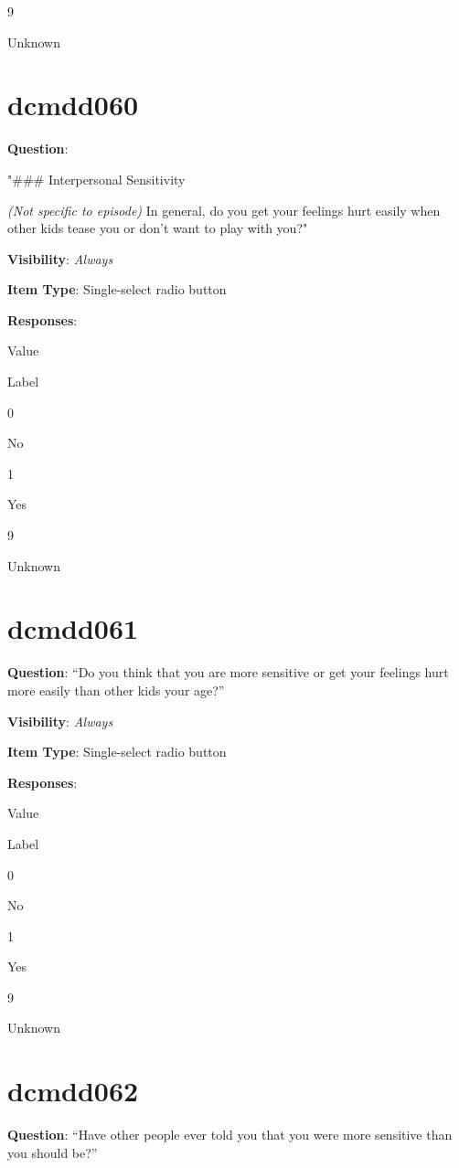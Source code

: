 \documentclass[
]{book}
\begin{document}
9

Unknown

\hypertarget{dcmdd060}{%
\section{dcmdd060}\label{dcmdd060}}

\textbf{Question}:

"\#\#\# Interpersonal Sensitivity

\emph{(Not specific to episode)} In general, do you get your feelings hurt easily when other kids tease you or don't want to play with you?"

\textbf{Visibility}: \emph{Always}

\textbf{Item Type}: Single-select radio button

\textbf{Responses}:

Value

Label

0

No

1

Yes

9

Unknown

\hypertarget{dcmdd061}{%
\section{dcmdd061}\label{dcmdd061}}

\textbf{Question}: ``Do you think that you are more sensitive or get your feelings hurt more easily than other kids your age?''

\textbf{Visibility}: \emph{Always}

\textbf{Item Type}: Single-select radio button

\textbf{Responses}:

Value

Label

0

No

1

Yes

9

Unknown

\hypertarget{dcmdd062}{%
\section{dcmdd062}\label{dcmdd062}}

\textbf{Question}: ``Have other people ever told you that you were more sensitive than you should be?''
\end{document}
